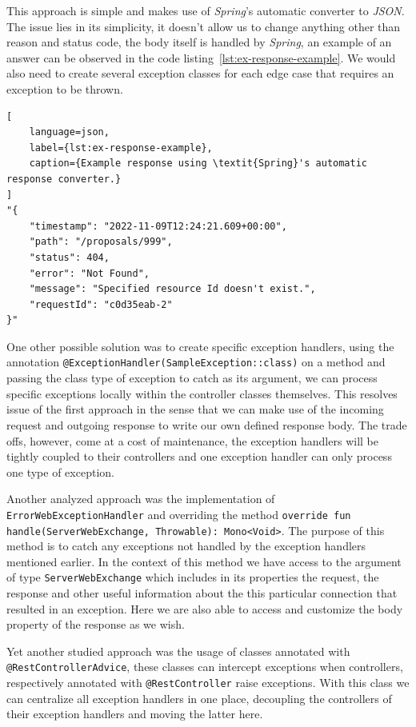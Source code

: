This approach is simple and makes use of \textit{Spring}'s automatic converter to \textit{JSON}. The issue lies in its simplicity, it doesn't allow us to change anything other than reason and status code, the body itself is handled by \textit{Spring}, an example of an answer can be observed in the code listing~\ref{lst:ex-response-example}. 
We would also need to create several exception classes for each edge case that requires an exception to be thrown.

\begin{lstlisting}[
    language=json,
    label={lst:ex-response-example},
    caption={Example response using \textit{Spring}'s automatic response converter.}
]
"{
    "timestamp": "2022-11-09T12:24:21.609+00:00",
    "path": "/proposals/999",
    "status": 404,
    "error": "Not Found",
    "message": "Specified resource Id doesn't exist.",
    "requestId": "c0d35eab-2"
}"
\end{lstlisting}


One other possible solution was to create specific exception handlers, using the annotation \texttt{@ExceptionHandler(SampleException::class)} on a method and passing the class type of exception to catch as its argument, we can process specific exceptions locally within the controller classes themselves. This resolves issue of the first approach in the sense that we can make use of the incoming request and outgoing response to write our own defined response body. 
The trade offs, however, come at a cost of maintenance, the exception handlers will be tightly coupled to their controllers and one exception handler can only process one type of exception.

Another analyzed approach was the implementation of \texttt{ErrorWebExceptionHandler} and overriding the method \texttt{override fun handle(ServerWebExchange, Throwable): Mono<Void>}. The purpose of this method is to catch any exceptions not handled by the exception handlers mentioned earlier. In the context of this method we have access to the argument of type \texttt{ServerWebExchange} which includes in its properties the request, the response and other useful information about the this particular connection that resulted in an exception. Here we are also able to access and customize the body property of the response as we wish.

Yet another studied approach was the usage of classes annotated with \texttt{@RestControllerAdvice}, these classes can intercept exceptions when controllers, respectively annotated with \texttt{@RestController} raise exceptions. With this class we can centralize all exception handlers in one place, decoupling the controllers of their exception handlers and moving the latter here. 

